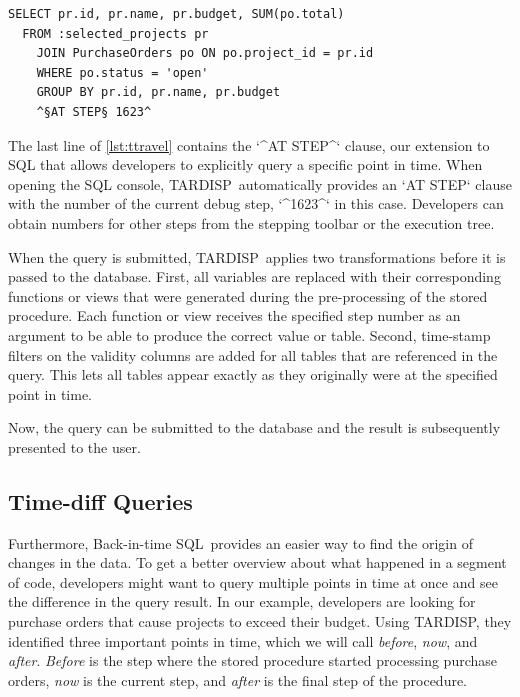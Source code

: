\documentclass[english,conference,final]{IEEEtran}
\newcommand{\tool}{TAR\-DISP}
\newcommand{\SQLextension}{Back-in-time SQL}
\begin{document}
\begin{lstlisting}[language=HanaSQL,float,caption={Example for a time-travel query: select the current total of open orders for previously selected projects at step 1623 of the execution},label=lst:ttravel]
  SELECT pr.id, pr.name, pr.budget, SUM(po.total)
  FROM :selected_projects pr
	JOIN PurchaseOrders po ON po.project_id = pr.id
	WHERE po.status = 'open'
	GROUP BY pr.id, pr.name, pr.budget
	^§AT STEP§ 1623^
\end{lstlisting}

The last line of \cref{lst:ttravel} contains the `^AT STEP^` clause, our extension to SQL that allows developers to explicitly query a specific point in time.
When opening the SQL console, \tool\ automatically provides an `AT STEP` clause with the number of the current debug step, `^1623^` in this case.
Developers can obtain numbers for other steps from the stepping toolbar or the execution tree. 

When the query is submitted, \tool\ applies two transformations before it is passed to the database.
First, all variables are replaced with their corresponding functions or views that were generated during the pre-processing of the stored procedure.
Each function or view receives the specified step number as an argument to be able to produce the correct value or table.
Second, time-stamp filters on the validity columns are added for all tables that are referenced in the query. 
This lets all tables appear exactly as they originally were at the specified point in time.

Now, the query can be submitted to the database and the result is subsequently presented to the user.

\subsection{Time-diff Queries}

Furthermore, \SQLextension\ provides an easier way to find the origin of changes in the data.
To get a better overview about what happened in a segment of code, developers might want to query multiple points in time at once and see the difference in the query result.
In our example, developers are looking for purchase orders that cause projects to exceed their budget.
Using \tool, they identified three important points in time, which we will call \emph{before}, \emph{now}, and \emph{after}.
\emph{Before} is the step where the stored procedure started processing purchase orders, \emph{now} is the current step, and \emph{after} is the final step of the procedure.
\end{document}
